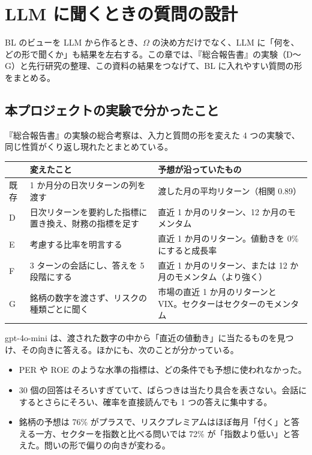 \chapter{LLM に聞くときの質問の設計}\label{ch:prompt}

BL のビューを LLM から作るとき、$\Omega$ の決め方だけでなく、LLM に「何を、どの形で聞くか」も結果を左右する。この章では、『総合報告書』の実験（D〜G）と先行研究の整理、この資料の結果をつなげて、BL に入れやすい質問の形をまとめる。

\section{本プロジェクトの実験で分かったこと}

『総合報告書』の実験の総合考察は、入力と質問の形を変えた 4 つの実験で、同じ性質がくり返し現れたとまとめている。

\begin{center}
\small
\begin{tabular}{p{0.9cm}p{5.0cm}p{7.0cm}}
\toprule
 & 変えたこと & 予想が沿っていたもの \\
\midrule
既存 & 1 か月分の日次リターンの列を渡す & 渡した月の平均リターン（相関 0.89） \\
D & 日次リターンを要約した指標に置き換え、財務の指標を足す & 直近 1 か月のリターン、12 か月のモメンタム \\
E & 考慮する比率を明言する & 直近 1 か月のリターン。値動きを 0\% にすると成長率 \\
F & 3 ターンの会話にし、答えを 5 段階にする & 直近 1 か月のリターン、または 12 か月のモメンタム（より強く） \\
G & 銘柄の数字を渡さず、リスクの種類ごとに聞く & 市場の直近 1 か月のリターンと VIX。セクターはセクターのモメンタム \\
\bottomrule
\end{tabular}
\end{center}

gpt-4o-mini は、渡された数字の中から「直近の値動き」に当たるものを見つけ、その向きに答える。ほかにも、次のことが分かっている。

\begin{itemize}
\item PER や ROE のような水準の指標は、どの条件でも予想に使われなかった。
\item 30 個の回答はそろいすぎていて、ばらつきは当たり具合を表さない。会話にするとさらにそろい、確率を直接読んでも 1 つの答えに集中する。
\item 銘柄の予想は 76\% がプラスで、リスクプレミアムはほぼ毎月「付く」と答える一方、セクターを指数と比べる問いでは 72\% が「指数より低い」と答えた。問いの形で偏りの向きが変わる。
\end{itemize}

